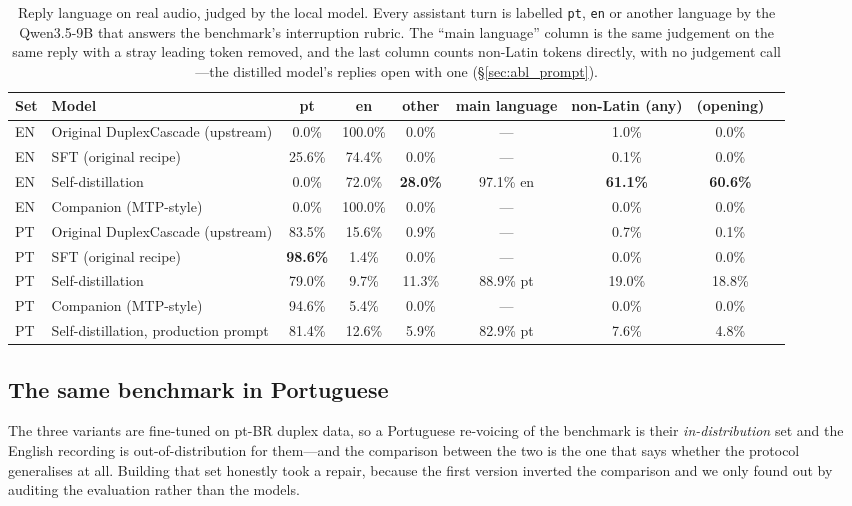 \documentclass[conference]{IEEEtran}
\begin{document}
\begin{table}[t]
\centering
\caption{Reply language on real audio, judged by the local model. Every assistant
turn is labelled \texttt{pt}, \texttt{en} or another language by the Qwen3.5-9B
that answers the benchmark's interruption rubric. The ``main language'' column is
the same judgement on the same reply with a stray leading token removed, and the
last column counts non-Latin tokens directly, with no judgement call---the
distilled model's replies open with one (\S\ref{sec:abl_prompt}).}
\label{tab:audio_lang}
\footnotesize
\begin{tabular}{llccccccc}
\toprule
Set & Model & pt & en & other & main language & non-Latin (any) & (opening) \\
\midrule
EN & Original DuplexCascade (upstream) & 0.0\% & 100.0\% & 0.0\% & --- & 1.0\% & 0.0\% \\
EN & SFT (original recipe)             & 25.6\% & 74.4\% & 0.0\% & --- & 0.1\% & 0.0\% \\
EN & Self-distillation                 & 0.0\% & 72.0\% & \textbf{28.0\%} & 97.1\% en & \textbf{61.1\%} & \textbf{60.6\%} \\
EN & Companion (MTP-style)             & 0.0\% & 100.0\% & 0.0\% & --- & 0.0\% & 0.0\% \\
\midrule
PT & Original DuplexCascade (upstream) & 83.5\% & 15.6\% & 0.9\% & --- & 0.7\% & 0.1\% \\
PT & SFT (original recipe)             & \textbf{98.6\%} & 1.4\% & 0.0\% & --- & 0.0\% & 0.0\% \\
PT & Self-distillation                 & 79.0\% & 9.7\% & 11.3\% & 88.9\% pt & 19.0\% & 18.8\% \\
PT & Companion (MTP-style)             & 94.6\% & 5.4\% & 0.0\% & --- & 0.0\% & 0.0\% \\
PT & Self-distillation, production prompt & 81.4\% & 12.6\% & 5.9\% & 82.9\% pt & 7.6\% & 4.8\% \\
\bottomrule
\end{tabular}
\end{table}

\subsection{The same benchmark in Portuguese}
\label{sec:audio_pt}

The three variants are fine-tuned on pt-BR duplex data, so a Portuguese
re-voicing of the benchmark is their \emph{in-distribution} set and the English
recording is out-of-distribution for them---and the comparison between the two
is the one that says whether the protocol generalises at all. Building that set
honestly took a repair, because the first version inverted the comparison and we
only found out by auditing the evaluation rather than the models.
\end{document}
